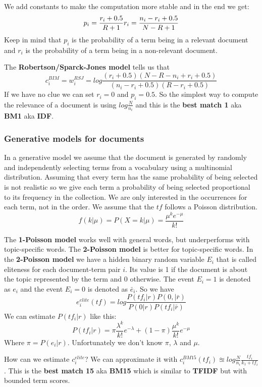 We add constants to make the computation more stable and in the end we get:
\[
    p_i = \frac{r_i+0.5}{R+1}\\
    r_i = \frac{n_i-r_i+0.5}{N-R+1}
\]
Keep in mind that $p_i$ is the probability of a term being in a relevant
document and $r_i$ is the probability of a term being in a non-relevant
document.

The \textbf{Robertson/Sparck-Jones model} tells us that
\[
    c_i^{BIM} = w_i^{RSJ} = 
        log\frac{(r_i+0.5)(N-R-n_i+r_i+0.5)}{(n_i-r_i+0.5)(R-r_i+0.5)}
\]
If we have no clue we can set $r_i=0$ and $p_i=0.5$.
So the simplest way to compute the relevance of a document is using
$log\frac{N}{n_i}$ and this is the \textbf{best match 1} aka \textbf{BM1} 
aka \textbf{IDF}.

\subsubsection{Generative models for documents}
\label{sec:generative_models_for_documents}

In a generative model we assume that the document is generated by
randomly and independently selecting terms from a vocabulary using
a multinomial distribution.
Assuming that every term has the same probability of being selected
is not realistic so we give each term a probability of being selected
proportional to its frequency in the collection.
We are only interested in the occurrences for each term, not in the order.
We assume that the $tf$ follows a Poisson distribution.
\[
    f(k|\mu) = P(X=k|\mu) = \frac{\mu^ke^{-\mu}}{k!}
\]

The \textbf{1-Poisson model} works well with general words, but underperforms
with topic-specific words.
The \textbf{2-Poisson model} is better for topic-specific words.
In the \textbf{2-Poisson model} we have a hidden binary random variable
$E_i$ that is called eliteness for each document-term pair $i$.
Its value is 1 if the document is about the topic represented by the term
and 0 otherwise.
The event $E_i=1$ is denoted as $e_i$ and the event $E_i=0$ is denoted as
$\bar{e}_i$.
So we have 
\[
    e_i^{elite}(tf) = log\frac{P(tf_i|r)P(0,|\bar{r})}{P(0|r)P(tf_i|\bar{r})}
\]
We can estimate $P(tf_i|r)$ like this:
\[
    P(tf_i|r) = \pi\frac{\lambda^k}{k!}e^{-\lambda}+(1-\pi)\frac{\mu^k}{k!}e^{-\mu}
\]
Where $\pi = P(e_i|r)$.
Unfortunately we don't know $\pi$, $\lambda$ and $\mu$.

How can we estimate $c_i^{elite}$?
We can approximate it with 
$c_i^{BM15}(tf_i)\approxeq log\frac{N}{n_i}\frac{tf_i}{k_1+tf_i}$.
This is the \textbf{best match 15} aka \textbf{BM15} which is similar to
\textbf{TFIDF} but with bounded term scores.

